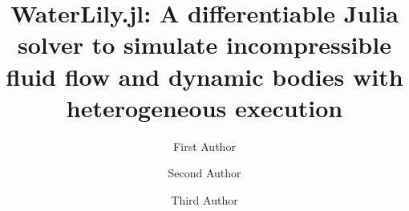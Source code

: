 \documentclass[final,3p,times]{elsarticle}
\begin{document}
\begin{frontmatter}



\title{WaterLily.jl: A differentiable Julia solver to simulate incompressible fluid flow and dynamic bodies with heterogeneous execution}


\author[a]{First Author}
\author[a,b]{Second Author}
\author[b]{Third Author}

\address[a]{First Address}
\address[b]{Second Address}




\end{frontmatter}
\end{document}
